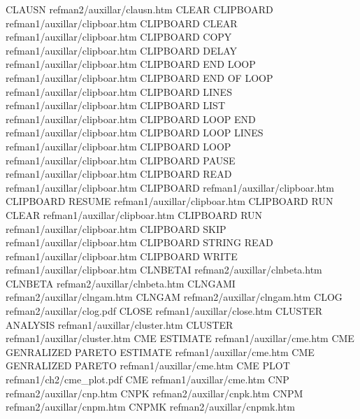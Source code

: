 CLAUSN                                  refman2/auxillar/clausn.htm
CLEAR CLIPBOARD                         refman1/auxillar/clipboar.htm
CLIPBOARD CLEAR                         refman1/auxillar/clipboar.htm
CLIPBOARD COPY                          refman1/auxillar/clipboar.htm
CLIPBOARD DELAY                         refman1/auxillar/clipboar.htm
CLIPBOARD END LOOP                      refman1/auxillar/clipboar.htm
CLIPBOARD END OF LOOP                   refman1/auxillar/clipboar.htm
CLIPBOARD LINES                         refman1/auxillar/clipboar.htm
CLIPBOARD LIST                          refman1/auxillar/clipboar.htm
CLIPBOARD LOOP END                      refman1/auxillar/clipboar.htm
CLIPBOARD LOOP LINES                    refman1/auxillar/clipboar.htm
CLIPBOARD LOOP                          refman1/auxillar/clipboar.htm
CLIPBOARD PAUSE                         refman1/auxillar/clipboar.htm
CLIPBOARD READ                          refman1/auxillar/clipboar.htm
CLIPBOARD                               refman1/auxillar/clipboar.htm
CLIPBOARD RESUME                        refman1/auxillar/clipboar.htm
CLIPBOARD RUN CLEAR                     refman1/auxillar/clipboar.htm
CLIPBOARD RUN                           refman1/auxillar/clipboar.htm
CLIPBOARD SKIP                          refman1/auxillar/clipboar.htm
CLIPBOARD STRING READ                   refman1/auxillar/clipboar.htm
CLIPBOARD WRITE                         refman1/auxillar/clipboar.htm
CLNBETAI                                refman2/auxillar/clnbeta.htm
CLNBETA                                 refman2/auxillar/clnbeta.htm
CLNGAMI                                 refman2/auxillar/clngam.htm
CLNGAM                                  refman2/auxillar/clngam.htm
CLOG                                    refman2/auxillar/clog.pdf
CLOSE                                   refman1/auxillar/close.htm
CLUSTER ANALYSIS                        refman1/auxillar/cluster.htm
CLUSTER                                 refman1/auxillar/cluster.htm
CME ESTIMATE                            refman1/auxillar/cme.htm
CME GENRALIZED PARETO ESTIMATE          refman1/auxillar/cme.htm
CME GENRALIZED PARETO                   refman1/auxillar/cme.htm
CME PLOT                                refman1/ch2/cme_plot.pdf
CME                                     refman1/auxillar/cme.htm
CNP                                     refman2/auxillar/cnp.htm
CNPK                                    refman2/auxillar/cnpk.htm
CNPM                                    refman2/auxillar/cnpm.htm
CNPMK                                   refman2/auxillar/cnpmk.htm
